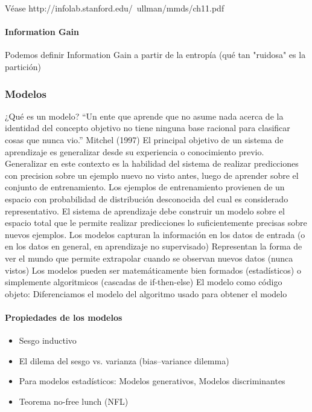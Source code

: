 \documentclass[a4paper,10pt]{article}
\begin{document}
	Véase http://infolab.stanford.edu/~ullman/mmds/ch11.pdf


	\paragraph{Information Gain}
	  Podemos definir Information Gain a partir de la entropía (qué tan "ruidosa" es la partición)

      \subsubsection{Modelos}

	¿Qué es un modelo?
	“Un ente que aprende que no asume nada acerca de la identidad del concepto objetivo no tiene ninguna base racional para clasificar cosas que nunca vio.”
	Mitchel (1997)
	El principal objetivo de un sistema de aprendizaje es generalizar desde su experiencia o conocimiento previo. Generalizar en este contexto es la habilidad del sistema de realizar
	predicciones con precision sobre un ejemplo nuevo no visto antes, luego de aprender sobre el conjunto de entrenamiento. Los ejemplos de entrenamiento provienen de un espacio 
	con probabilidad de distribución desconocida del cual es considerado representativo. El sistema de aprendizaje debe construir un modelo sobre el espacio total que le permite realizar
	predicciones lo suficientemente precisas sobre nuevos ejemplos.
	Los modelos capturan la información en los datos de entrada (o en los datos en general, en aprendizaje no supervisado)
	Representan la forma de ver el mundo que permite extrapolar cuando se observan nuevos datos (nunca vistos)
	Los modelos pueden ser matemáticamente bien formados (estadísticos) o simplemente algoritmicos (cascadas de if-then-else)
	El modelo como código objeto: Diferenciamos el modelo del algoritmo usado para obtener el modelo

	\paragraph{Propiedades de los modelos}
	  \begin{itemize}
	    \item Sesgo inductivo
	    \item El dilema del sesgo vs. varianza (bias–variance dilemma)
	    \item Para modelos estadísticos: Modelos generativos, Modelos discriminantes
	    \item Teorema no-free lunch (NFL)
	  \end{itemize}
\end{document}
